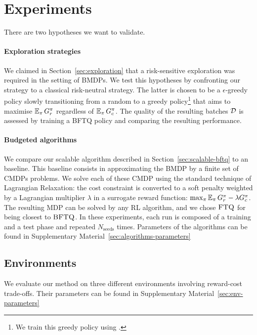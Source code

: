\documentclass{article}
\begin{document}
\section{Experiments}

There are two hypotheses we want to validate.

\paragraph{Exploration strategies} We claimed in Section~\ref{sec:exploration} that a risk-sensitive exploration was required in the setting of BMDPs. We test this hypotheses by confronting our strategy to a classical risk-neutral strategy. The latter is chosen to be a $\epsilon$-greedy policy slowly transitioning from a random to a greedy policy\footnote{We train this greedy policy using \FTQ.} that aims to maximise $\operatorname*{\mathbb{E}}_{\pi} G_r^\pi$ regardless of $\operatorname*{\mathbb{E}}_{\pi} G_c^\pi$. The quality of the resulting batches $\mathcal{D}$ is assessed by training a BFTQ policy and comparing the resulting performance.

\paragraph{Budgeted algorithms} We compare our  scalable \BFTQ algorithm described in Section~\ref{sec:scalable-bftq} to an \FTQl baseline. This baseline consists in approximating the BMDP by a finite set of CMDPs problems. We solve each of these CMDP using the standard technique of Lagrangian Relaxation: the cost constraint is converted to a soft penalty weighted by a Lagrangian multiplier $\lambda$ in a surrogate reward function: $\max_{\pi} \operatorname*{\mathbb{E}}_{\pi} G_r^\pi - \lambda G_c^\pi\label{eq:lagrangian}$. The resulting MDP can be solved by any RL algorithm, and we chose $\textrm{\textsc{FTQ}}$ for being closest to $\textrm{\textsc{BFTQ}}$.
In these experiments, each run is composed of a training and a test phase and repeated $N_{\text{seeds}}$ times. Parameters of the algorithms can be found in Supplementary Material~\ref{sec:algorithms-parameters}

\subsection{Environments}

We evaluate our method on three different environments involving reward-cost trade-offs. Their parameters can be found in Supplementary Material~\ref{sec:env-parameters}
\end{document}
